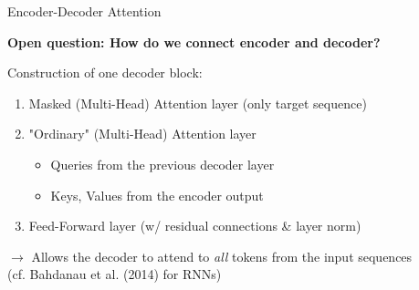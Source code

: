 
\begin{vbframe}{Encoder-Decoder Attention}

\vfill

\textbf{Open question: How do we connect encoder and decoder?}\\

\vspace{.3cm}
	
Construction of one decoder block:

\vspace{.3cm}
	
	\begin{enumerate}
		\item Masked (Multi-Head) Attention layer (only target sequence)
		\item "Ordinary" (Multi-Head) Attention layer
			\begin{itemize}
				\item Queries from the previous decoder layer
				\item Keys, Values from the encoder output
			\end{itemize}
		\item Feed-Forward layer (w/ residual connections \& layer norm)
	\end{enumerate}
	
\vspace{.3cm}
	
$\to$ Allows the decoder to attend to \textit{all} tokens from the input sequences\\
(cf. Bahdanau et al. (2014) for RNNs)

\vfill

\end{vbframe}


